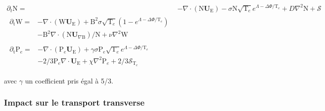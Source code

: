 \begin{refsection}
\begin{align}
\label{2-eqContinuiteTemp}
\partial_t \text{N}
=& - \nabla\cdot\left(\text{N}\mathbf U_\text{E}\right) -\sigma
\text{N}\sqrt{\text{T}_e}e^{\Lambda-\Delta\Phi/\text{T}_e} + D\nabla^2 \text{N}
+ \mathcal{S}
\\[0.5cm]
\label{2-eqCourantTemp}
\begin{split}
\partial_\text{t}\text{W} =& 
-\nabla\cdot\left(\text{W}\mathbf U_\text{E}\right)
+\text{B}^2\sigma\sqrt{\text{T}_e}\left(1-e^{\Lambda-\Delta\Phi/\text{T}_e}\right)\\
&-\text{B}^2\nabla\cdot\left(\text{N}\mathbf
U_{\nabla\text{B}}\right)/\text{N} +\nu\nabla^2\text{W}
\end{split}
\\[0.5cm]
\label{2-eqEnergyTemp}
\begin{split}
\partial_\text{t}\text{P}_e=&
-\nabla\cdot\left(\text{P}_e\mathbf U_\text{E}\right)
+\gamma\sigma\text{P}_e\sqrt{\text{T}_e}e^{\Lambda-\Delta\Phi/\text{T}_e}\\
&-2/3\text{P}_e\nabla\cdot\mathbf U_\text{E}
+\chi\nabla^2\text{P}_e
+2/3\mathcal{S}_{\text{T}_e}
\end{split}
\end{align}


avec $\gamma$ un coefficient pris égal à 5/3. 
\subsubsection{Impact sur le transport transverse}


\end{refsection}
